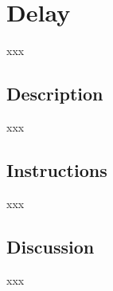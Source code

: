 \section{Delay}
xxx
\subsection{Description}
xxx
\subsection{Instructions}
xxx
\subsection{Discussion}
xxx
